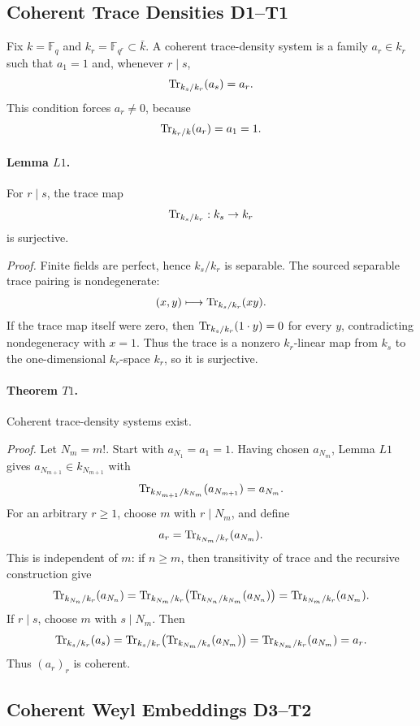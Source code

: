 \subsection{Coherent Trace Densities D1--T1}

Fix \(k=\mathbb F_q\) and \(k_r=\mathbb F_{q^r}\subset\bar k\).  A coherent
trace-density system is a family \(a_r\in k_r\) such that \(a_1=1\) and,
whenever \(r\mid s\),
\[
  \operatorname{Tr}_{k_s/k_r}(a_s)=a_r .
\]
This condition forces \(a_r\ne0\), because
\[
  \operatorname{Tr}_{k_r/k}(a_r)=a_1=1.
\]

\paragraph{Lemma \(L1\).}
For \(r\mid s\), the trace map
\[
  \operatorname{Tr}_{k_s/k_r}:k_s\to k_r
\]
is surjective.

\emph{Proof.}
Finite fields are perfect, hence \(k_s/k_r\) is separable.  The sourced
separable trace pairing is nondegenerate:
\[
  (x,y)\longmapsto \operatorname{Tr}_{k_s/k_r}(xy).
\]
If the trace map itself were zero, then \(\operatorname{Tr}_{k_s/k_r}(1\cdot y)=0\) for
every \(y\), contradicting nondegeneracy with \(x=1\).  Thus the trace is a
nonzero \(k_r\)-linear map from \(k_s\) to the one-dimensional \(k_r\)-space
\(k_r\), so it is surjective.

\paragraph{Theorem \(T1\).}
Coherent trace-density systems exist.

\emph{Proof.}
Let \(N_m=m!\).  Start with \(a_{N_1}=a_1=1\).  Having chosen
\(a_{N_m}\), Lemma \(L1\) gives \(a_{N_{m+1}}\in k_{N_{m+1}}\) with
\[
  \operatorname{Tr}_{k_{N_{m+1}}/k_{N_m}}(a_{N_{m+1}})=a_{N_m}.
\]
For an arbitrary \(r\ge1\), choose \(m\) with \(r\mid N_m\), and define
\[
  a_r=\operatorname{Tr}_{k_{N_m}/k_r}(a_{N_m}).
\]
This is independent of \(m\): if \(n\ge m\), then transitivity of trace and
the recursive construction give
\[
  \operatorname{Tr}_{k_{N_n}/k_r}(a_{N_n})
  =
  \operatorname{Tr}_{k_{N_m}/k_r}
  \bigl(\operatorname{Tr}_{k_{N_n}/k_{N_m}}(a_{N_n})\bigr)
  =
  \operatorname{Tr}_{k_{N_m}/k_r}(a_{N_m}).
\]
If \(r\mid s\), choose \(m\) with \(s\mid N_m\).  Then
\[
  \operatorname{Tr}_{k_s/k_r}(a_s)
  =
  \operatorname{Tr}_{k_s/k_r}
  \bigl(\operatorname{Tr}_{k_{N_m}/k_s}(a_{N_m})\bigr)
  =
  \operatorname{Tr}_{k_{N_m}/k_r}(a_{N_m})
  =
  a_r.
\]
Thus \((a_r)_r\) is coherent.

\subsection{Coherent Weyl Embeddings D3--T2}

